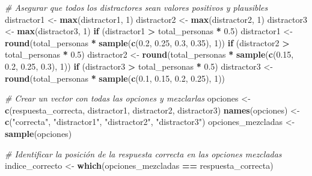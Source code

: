 \documentclass[
]{article}
\newenvironment{Shaded}{\begin{snugshade}}{\end{snugshade}}
\newcommand{\CommentTok}[1]{\textcolor[rgb]{0.56,0.35,0.01}{\textit{#1}}}
\newcommand{\ControlFlowTok}[1]{\textcolor[rgb]{0.13,0.29,0.53}{\textbf{#1}}}
\newcommand{\DecValTok}[1]{\textcolor[rgb]{0.00,0.00,0.81}{#1}}
\newcommand{\FloatTok}[1]{\textcolor[rgb]{0.00,0.00,0.81}{#1}}
\newcommand{\FunctionTok}[1]{\textcolor[rgb]{0.13,0.29,0.53}{\textbf{#1}}}
\newcommand{\NormalTok}[1]{#1}
\newcommand{\OtherTok}[1]{\textcolor[rgb]{0.56,0.35,0.01}{#1}}
\newcommand{\SpecialCharTok}[1]{\textcolor[rgb]{0.81,0.36,0.00}{\textbf{#1}}}
\newcommand{\StringTok}[1]{\textcolor[rgb]{0.31,0.60,0.02}{#1}}
\begin{document}
\begin{Shaded}
\begin{Highlighting}[]
\CommentTok{\# Asegurar que todos los distractores sean valores positivos y plausibles}
\NormalTok{distractor1 }\OtherTok{\textless{}{-}} \FunctionTok{max}\NormalTok{(distractor1, }\DecValTok{1}\NormalTok{)}
\NormalTok{distractor2 }\OtherTok{\textless{}{-}} \FunctionTok{max}\NormalTok{(distractor2, }\DecValTok{1}\NormalTok{)}
\NormalTok{distractor3 }\OtherTok{\textless{}{-}} \FunctionTok{max}\NormalTok{(distractor3, }\DecValTok{1}\NormalTok{)}
\ControlFlowTok{if}\NormalTok{ (distractor1 }\SpecialCharTok{\textgreater{}}\NormalTok{ total\_personas }\SpecialCharTok{*} \FloatTok{0.5}\NormalTok{) distractor1 }\OtherTok{\textless{}{-}} \FunctionTok{round}\NormalTok{(total\_personas }\SpecialCharTok{*} \FunctionTok{sample}\NormalTok{(}\FunctionTok{c}\NormalTok{(}\FloatTok{0.2}\NormalTok{, }\FloatTok{0.25}\NormalTok{, }\FloatTok{0.3}\NormalTok{, }\FloatTok{0.35}\NormalTok{), }\DecValTok{1}\NormalTok{))}
\ControlFlowTok{if}\NormalTok{ (distractor2 }\SpecialCharTok{\textgreater{}}\NormalTok{ total\_personas }\SpecialCharTok{*} \FloatTok{0.5}\NormalTok{) distractor2 }\OtherTok{\textless{}{-}} \FunctionTok{round}\NormalTok{(total\_personas }\SpecialCharTok{*} \FunctionTok{sample}\NormalTok{(}\FunctionTok{c}\NormalTok{(}\FloatTok{0.15}\NormalTok{, }\FloatTok{0.2}\NormalTok{, }\FloatTok{0.25}\NormalTok{, }\FloatTok{0.3}\NormalTok{), }\DecValTok{1}\NormalTok{))}
\ControlFlowTok{if}\NormalTok{ (distractor3 }\SpecialCharTok{\textgreater{}}\NormalTok{ total\_personas }\SpecialCharTok{*} \FloatTok{0.5}\NormalTok{) distractor3 }\OtherTok{\textless{}{-}} \FunctionTok{round}\NormalTok{(total\_personas }\SpecialCharTok{*} \FunctionTok{sample}\NormalTok{(}\FunctionTok{c}\NormalTok{(}\FloatTok{0.1}\NormalTok{, }\FloatTok{0.15}\NormalTok{, }\FloatTok{0.2}\NormalTok{, }\FloatTok{0.25}\NormalTok{), }\DecValTok{1}\NormalTok{))}

\CommentTok{\# Crear un vector con todas las opciones y mezclarlas}
\NormalTok{opciones }\OtherTok{\textless{}{-}} \FunctionTok{c}\NormalTok{(respuesta\_correcta, distractor1, distractor2, distractor3)}
\FunctionTok{names}\NormalTok{(opciones) }\OtherTok{\textless{}{-}} \FunctionTok{c}\NormalTok{(}\StringTok{"correcta"}\NormalTok{, }\StringTok{"distractor1"}\NormalTok{, }\StringTok{"distractor2"}\NormalTok{, }\StringTok{"distractor3"}\NormalTok{)}
\NormalTok{opciones\_mezcladas }\OtherTok{\textless{}{-}} \FunctionTok{sample}\NormalTok{(opciones)}

\CommentTok{\# Identificar la posición de la respuesta correcta en las opciones mezcladas}
\NormalTok{indice\_correcto }\OtherTok{\textless{}{-}} \FunctionTok{which}\NormalTok{(opciones\_mezcladas }\SpecialCharTok{==}\NormalTok{ respuesta\_correcta)}


\end{Highlighting}
\end{Shaded}
\end{document}
